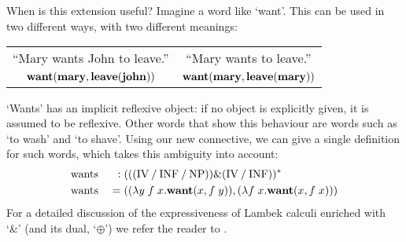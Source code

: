When is this extension useful? Imagine a word like `want'. This can be
used in two different ways, with two different meanings:\\
\begin{center}
  \vspace{-1\baselineskip}
  \renewcommand{\arraystretch}{1}
  \begin{tabular}{c c}
    ``Mary wants John to leave.'' & ``Mary wants to leave.''\\
    $\WANT(\MARY,\LEAVE(\JOHN))$  & $\WANT(\MARY,\LEAVE(\MARY))$
  \end{tabular}
\end{center}
`Wants' has an implicit reflexive object: if no object is explicitly
given, it is assumed to be reflexive. Other words that show this
behaviour are words such as `to wash' and `to shave'.
Using our new connective, we can give a single definition for such
words, which takes this ambiguity into account:
\begin{alignat*}{3}
  &\text{wants}\;&:\;&\tr[(((\IV\impl\INF\impl\NP))\&(\IV\impl\INF))]\\
  &\text{wants}\;&=\;&((\lambda y\;f\;x.\WANT(x,f\;y)),(\lambda f\;x.\WANT(x,f\;x)))
\end{alignat*}
For a detailed discussion of the expressiveness of Lambek calculi
enriched with `\&' (and its dual, `$\oplus$') we refer the reader to
\citet{kanazawa1992}.

